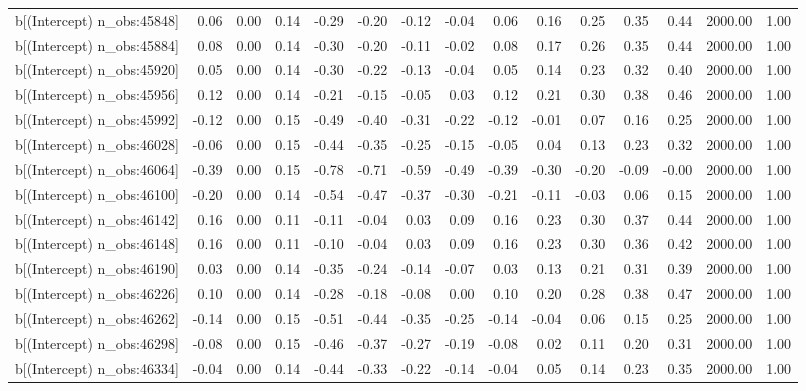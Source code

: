 \begin{table}[ht]
\begin{tabular}{rrrrrrrrrrrrrrr}
  b[(Intercept) n\_obs:45848] & 0.06 & 0.00 & 0.14 & -0.29 & -0.20 & -0.12 & -0.04 & 0.06 & 0.16 & 0.25 & 0.35 & 0.44 & 2000.00 & 1.00 \\ 
  b[(Intercept) n\_obs:45884] & 0.08 & 0.00 & 0.14 & -0.30 & -0.20 & -0.11 & -0.02 & 0.08 & 0.17 & 0.26 & 0.35 & 0.44 & 2000.00 & 1.00 \\ 
  b[(Intercept) n\_obs:45920] & 0.05 & 0.00 & 0.14 & -0.30 & -0.22 & -0.13 & -0.04 & 0.05 & 0.14 & 0.23 & 0.32 & 0.40 & 2000.00 & 1.00 \\ 
  b[(Intercept) n\_obs:45956] & 0.12 & 0.00 & 0.14 & -0.21 & -0.15 & -0.05 & 0.03 & 0.12 & 0.21 & 0.30 & 0.38 & 0.46 & 2000.00 & 1.00 \\ 
  b[(Intercept) n\_obs:45992] & -0.12 & 0.00 & 0.15 & -0.49 & -0.40 & -0.31 & -0.22 & -0.12 & -0.01 & 0.07 & 0.16 & 0.25 & 2000.00 & 1.00 \\ 
  b[(Intercept) n\_obs:46028] & -0.06 & 0.00 & 0.15 & -0.44 & -0.35 & -0.25 & -0.15 & -0.05 & 0.04 & 0.13 & 0.23 & 0.32 & 2000.00 & 1.00 \\ 
  b[(Intercept) n\_obs:46064] & -0.39 & 0.00 & 0.15 & -0.78 & -0.71 & -0.59 & -0.49 & -0.39 & -0.30 & -0.20 & -0.09 & -0.00 & 2000.00 & 1.00 \\ 
  b[(Intercept) n\_obs:46100] & -0.20 & 0.00 & 0.14 & -0.54 & -0.47 & -0.37 & -0.30 & -0.21 & -0.11 & -0.03 & 0.06 & 0.15 & 2000.00 & 1.00 \\ 
  b[(Intercept) n\_obs:46142] & 0.16 & 0.00 & 0.11 & -0.11 & -0.04 & 0.03 & 0.09 & 0.16 & 0.23 & 0.30 & 0.37 & 0.44 & 2000.00 & 1.00 \\ 
  b[(Intercept) n\_obs:46148] & 0.16 & 0.00 & 0.11 & -0.10 & -0.04 & 0.03 & 0.09 & 0.16 & 0.23 & 0.30 & 0.36 & 0.42 & 2000.00 & 1.00 \\ 
  b[(Intercept) n\_obs:46190] & 0.03 & 0.00 & 0.14 & -0.35 & -0.24 & -0.14 & -0.07 & 0.03 & 0.13 & 0.21 & 0.31 & 0.39 & 2000.00 & 1.00 \\ 
  b[(Intercept) n\_obs:46226] & 0.10 & 0.00 & 0.14 & -0.28 & -0.18 & -0.08 & 0.00 & 0.10 & 0.20 & 0.28 & 0.38 & 0.47 & 2000.00 & 1.00 \\ 
  b[(Intercept) n\_obs:46262] & -0.14 & 0.00 & 0.15 & -0.51 & -0.44 & -0.35 & -0.25 & -0.14 & -0.04 & 0.06 & 0.15 & 0.25 & 2000.00 & 1.00 \\ 
  b[(Intercept) n\_obs:46298] & -0.08 & 0.00 & 0.15 & -0.46 & -0.37 & -0.27 & -0.19 & -0.08 & 0.02 & 0.11 & 0.20 & 0.31 & 2000.00 & 1.00 \\ 
  b[(Intercept) n\_obs:46334] & -0.04 & 0.00 & 0.14 & -0.44 & -0.33 & -0.22 & -0.14 & -0.04 & 0.05 & 0.14 & 0.23 & 0.35 & 2000.00 & 1.00 \\ 

\end{tabular}
\end{table}
